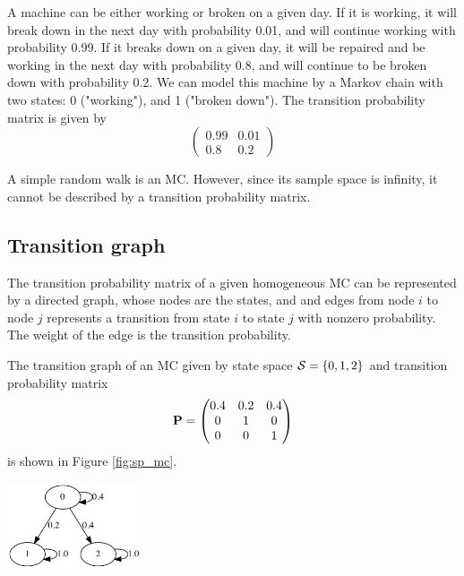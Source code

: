 \begin{example}
A machine can be either working or broken on a given day. If it is working, it will break down in the next day with probability 0.01, and will continue working with probability 0.99. If it breaks down
on a given day, it will be repaired and be working in the next day with probability 0.8, and will continue to be broken down with probability 0.2. We can model this machine by a Markov chain with two states: 0 ("working"), and 1 ("broken down"). The transition probability matrix is given by
$$
\begin{pmatrix}
0.99 & 0.01 \\
0.8 & 0.2
\end{pmatrix}
$$
\end{example}

\begin{example}[SRW]
A simple random walk is an MC. However, since its sample space is infinity, it cannot be described by a transition probability matrix.
\end{example}

\subsection{Transition graph}

The transition probability matrix of a given homogeneous MC can be  represented by a directed graph, whose nodes are the states, and and edges from node $i$ to node $j$ represents a transition from state $i$ to state $j$ with nonzero probability. The weight of the edge is the transition probability.

\begin{example}\label{sp:MC3ex}
The transition graph of an MC given by state space ${\cal S} = \{0, 1, 2\}$ and transition probability matrix
\begin{align}
\label{sp:MC3example}
{\bf P} = \begin{pmatrix}
0.4 & 0.2 & 0.4 \\
0   & 1   & 0 \\
0   & 0   & 1 
\end{pmatrix}
\end{align}
is shown in Figure \ref{fig:sp_mc}.

  \begin{center}
    \includegraphics[width=4cm]{Figures/MC0_markov_chan_graph.png} 
    \label{fig:sp_mc}
  \end{center}

\end{example}

